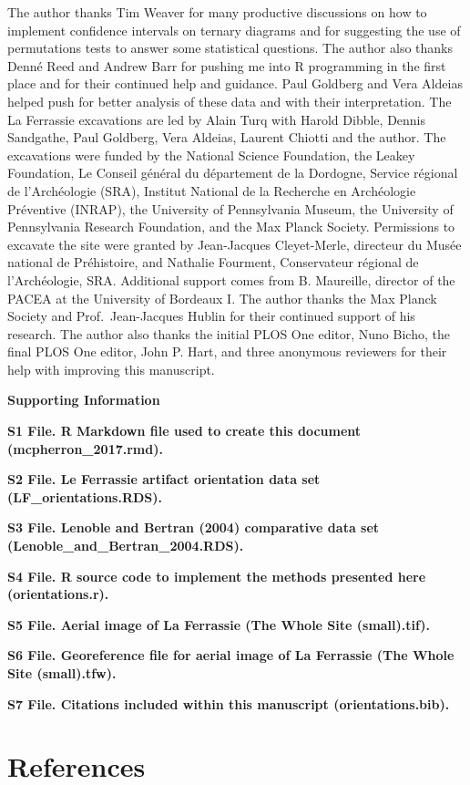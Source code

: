 \documentclass[]{article}
\begin{document}
The author thanks Tim Weaver for many productive discussions on how to
implement confidence intervals on ternary diagrams and for suggesting
the use of permutations tests to answer some statistical questions. The
author also thanks Denné Reed and Andrew Barr for pushing me into R
programming in the first place and for their continued help and
guidance. Paul Goldberg and Vera Aldeias helped push for better analysis
of these data and with their interpretation. The La Ferrassie
excavations are led by Alain Turq with Harold Dibble, Dennis Sandgathe,
Paul Goldberg, Vera Aldeias, Laurent Chiotti and the author. The
excavations were funded by the National Science Foundation, the Leakey
Foundation, Le Conseil général du département de la Dordogne, Service
régional de l'Archéologie (SRA), Institut National de la Recherche en
Archéologie Préventive (INRAP), the University of Pennsylvania Museum,
the University of Pennsylvania Research Foundation, and the Max Planck
Society. Permissions to excavate the site were granted by Jean-Jacques
Cleyet-Merle, directeur du Musée national de Préhistoire, and Nathalie
Fourment, Conservateur régional de l'Archéologie, SRA. Additional
support comes from B. Maureille, director of the PACEA at the University
of Bordeaux I. The author thanks the Max Planck Society and
Prof.~Jean-Jacques Hublin for their continued support of his research.
The author also thanks the initial PLOS One editor, Nuno Bicho, the
final PLOS One editor, John P. Hart, and three anonymous reviewers for
their help with improving this manuscript.

\textbf{Supporting Information}

\textbf{S1 File. R Markdown file used to create this document
(mcpherron\_2017.rmd).}

\textbf{S2 File. Le Ferrassie artifact orientation data set
(LF\_orientations.RDS).}

\textbf{S3 File. Lenoble and Bertran (2004) comparative data set
(Lenoble\_and\_Bertran\_2004.RDS).}

\textbf{S4 File. R source code to implement the methods presented here
(orientations.r).}

\textbf{S5 File. Aerial image of La Ferrassie (The Whole Site
(small).tif).}

\textbf{S6 File. Georeference file for aerial image of La Ferrassie (The
Whole Site (small).tfw).}

\textbf{S7 File. Citations included within this manuscript
(orientations.bib).}

\section*{References}\label{references}
\end{document}
